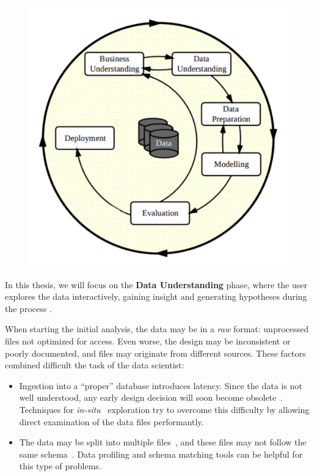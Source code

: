 \begin{figure}[htb]
    \centering
    \includegraphics[width=0.8\linewidth]{images/1_introduction/crisp-dm.pdf}
    \caption{}
    \label{fig:crispdm}
\end{figure}

In this thesis, we will focus on the \textbf{Data Understanding} phase, where the user
explores the data interactively, gaining insight and generating hypotheses during the process \cite{Geer2014}.

When starting the initial analysis, the data may be in a \emph{raw} format: unprocessed files not
optimized for access. Even worse, the design may be inconsistent or poorly documented, and files may
originate from different sources. These factors combined difficult the task of the data scientist:

\begin{itemize}
    \item Ingestion into a ``proper'' database introduces latency. Since the data is not well
        understood, any early design decision will soon become obsolete~\cite{Kersten2011}.
        Techniques for \emph{in-situ}~\cite{Idreos2011} exploration try to overcome this difficulty
        by allowing direct examination of the data files performantly.
    \item The data may be split into multiple files~\cite{Baud2012}, and these files may not
        follow the same schema~\cite{Alawini2014}. Data profiling and schema matching tools
        can be helpful for this type of problems.
\end{itemize}

